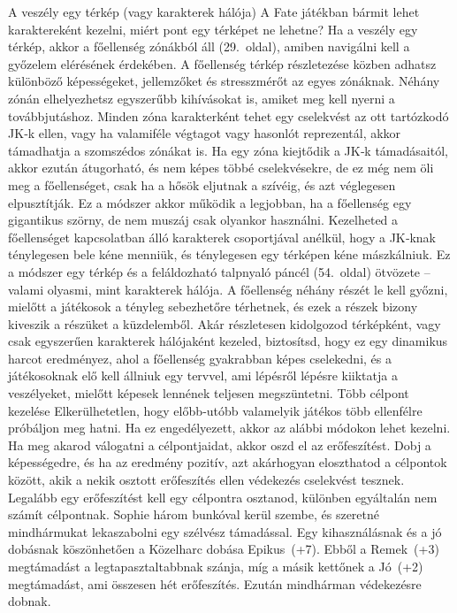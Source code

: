 \documentclass[oneside]{book}
\newcommand{\page}[1]{#1.~oldal}
\begin{document}
A veszély egy térkép (vagy karakterek hálója)
A Fate játékban bármit lehet karaktereként kezelni, miért pont egy térképet ne lehetne? Ha a veszély egy térkép, akkor a főellenség zónákból áll (\page{29}), amiben navigálni kell a győzelem elérésének érdekében.
A főellenség térkép részletezése közben adhatsz különböző képességeket, jellemzőket és stresszmérőt az egyes zónáknak. Néhány zónán elhelyezhetsz egyszerűbb kihívásokat is, amiket meg kell nyerni a továbbjutáshoz. Minden zóna karakterként tehet egy cselekvést az ott tartózkodó JK‑k ellen, vagy ha valamiféle végtagot vagy hasonlót reprezentál, akkor támadhatja a szomszédos zónákat is. Ha egy zóna kiejtődik a JK‑k támadásaitól, akkor ezután átugorható, és nem képes többé cselekvésekre, de ez még nem öli meg a főellenséget, csak ha a hősök eljutnak a szívéig, és azt véglegesen elpusztítják.
Ez a módszer akkor működik a legjobban, ha a főellenség egy gigantikus szörny, de nem muszáj csak olyankor használni. Kezelheted a főellenséget kapcsolatban álló karakterek csoportjával anélkül, hogy a JK‑knak ténylegesen bele kéne menniük, és ténylegesen egy térképen kéne mászkálniuk. Ez a módszer egy térkép és a feláldozható talpnyaló páncél (\page{54}) ötvözete – valami olyasmi, mint karakterek hálója. A főellenség néhány részét le kell győzni, mielőtt a játékosok a tényleg sebezhetőre térhetnek, és ezek a részek bizony kiveszik a részüket a küzdelemből.
Akár részletesen kidolgozod térképként, vagy csak egyszerűen karakterek hálójaként kezeled, biztosítsd, hogy ez egy dinamikus harcot eredményez, ahol a főellenség gyakrabban képes cselekedni, és a játékosoknak elő kell állniuk egy tervvel, ami lépésről lépésre kiiktatja a veszélyeket, mielőtt képesek lennének teljesen megszüntetni.
Több célpont kezelése
Elkerülhetetlen, hogy előbb‑utóbb valamelyik játékos több ellenfélre próbáljon meg hatni. Ha ez engedélyezett, akkor az alábbi módokon lehet kezelni.
Ha meg akarod válogatni a célpontjaidat, akkor oszd el az erőfeszítést. Dobj a képességedre, és ha az eredmény pozitív, azt akárhogyan eloszthatod a célpontok között, akik a nekik osztott erőfeszítés ellen védekezés cselekvést tesznek. Legalább egy erőfeszítést kell egy célpontra osztanod, különben egyáltalán nem számít célpontnak.
Sophie három bunkóval kerül szembe, és szeretné mindhármukat lekaszabolni egy szélvész támadással. Egy kihasználásnak és a jó dobásnak köszönhetően a Közelharc dobása Epikus~(+7). Ebből a Remek~(+3) megtámadást a legtapasztaltabbnak szánja, míg a másik kettőnek a Jó~(+2) megtámadást, ami összesen hét erőfeszítés. Ezután mindhárman védekezésre dobnak.
\end{document}
